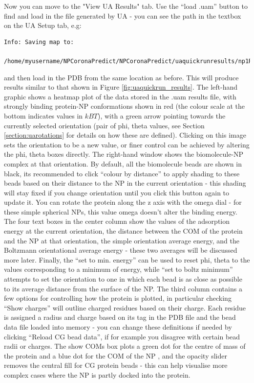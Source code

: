 \documentclass[10pt,a4paper,onecolumn]{report}
\begin{document}
Now you can move to the "View  UA Results" tab. Use the ``load .uam'' button to find and load in the file generated by UA - you can see the path in the textbox on the UA Setup tab, e.g:
\begin{lstlisting}
Info: Saving map to: 

/home/myusername/NPCoronaPredict/NPCoronaPredict/uaquickrunresults/np1R_10_ZP_0/P02768_10_0.uam
\end{lstlisting}
and then load in the PDB from the same location as before. This will produce results similar to that shown in Figure \ref{fig:uaquickrun_results}. The left-hand graphic shows a heatmap plot of the data stored in the .uam results file, with strongly binding protein-NP conformations shown in red (the colour scale at the bottom indicates values in $kBT$), with a green arrow pointing towards the currently selected orientation (pair of phi, theta values, see Section \ref{section:uarotations} for details on how these are defined). Clicking on this image sets the orientation to be a new value, or finer control can be achieved by altering the phi, theta boxes directly. The right-hand window shows the biomolecule-NP complex at that orientation. By default, all the biomolecule beads are shown in black, its recommended to click ``colour by  distance'' to apply shading to these beads based on their distance to the NP in the current orientation - this shading will stay fixed if you change orientation until you click this button again to update it.  You can rotate the protein along the z axis with the omega dial - for these simple spherical NPs, this value omega doesn't alter the binding energy. The four text boxes in the center column show the values of the adsorption energy at the current orientation, the distance between the COM of the protein and the NP at that orientation, the simple orientation average energy, and the Boltzmann orientational average energy - these two averages will be discussed more later. Finally, the ``set to min. energy'' can be used to reset phi, theta to the values corresponding to a minimum of energy, while ``set to boltz minimum'' attempts to set the orientation to one in which each bead is as close as possible to its average distance from the surface of the NP. The third column contains a few options for controlling how the protein is plotted, in particular checking ``Show charges'' will outline charged residues based on their charge. Each residue is assigned a radius and charge based on its tag in the PDB file and the bead data file loaded into memory - you can change these definitions if needed by clicking ``Reload CG bead data'', if for example you disagree with certain bead radii or charges. The show COMs box plots a green dot for the centre of mass of the protein and a blue dot for the COM of the NP , and the opacity slider removes the central fill for CG protein beads - this can help visualise more complex cases where the NP is partly docked into the protein. 
 
\end{document}
